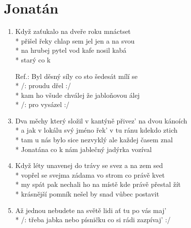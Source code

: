 \section{Jonatán}
\vfil
\begin{enumerate}
\item Když  zaťukalo na dveře roku mnáctset \\*
přišel  řeky chlap  sem jel jen  a na svou  \\*
na  hrubej pytel vod kafe nosil  kabá \\*
starý   co k    
\item[Ref.:] Byl  děsný síly co sto šedesát mílí se \\*
/:  proudu dřel :/ \\*
kam  ho všude chválej že jabloňovou álej \\*
/: pro  vysázel :/    
\item Dva měchy který složil v kantýně přivez' na dvou kánoích \\*
a jak v lokálu svý jméno řek' v tu ránu kdekdo ztich \\*
tam u nás bylo sice nezvyklý ale každej časem znal \\*
Jonatána co k nám jablečný jadýrka vozíval 
\item Když léty unavenej do trávy se svez a na zem sed \\*
vopřel se svejma zádama vo strom co právě kvet \\*
my spát pak nechali ho na místě kde právě přestal žít \\*
krásnější pomník nešel by snad vůbec postavit 
\item Až jednou nebudete na světě lidi ať tu po vás maj' \\*
/: třeba jabka nebo písničku co si rádi zazpívaj' :/ 
\end{enumerate}

